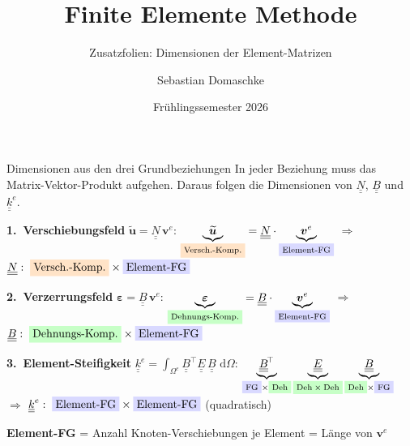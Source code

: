 \documentclass[aspectratio=169,professionalfonts]{beamer}
\title[FEM Zusatz]{Finite Elemente Methode}
\subtitle{Zusatzfolien: Dimensionen der Element-Matrizen}
\author[ZHAW]{Sebastian Domaschke}
\institute[ZHAW]{Zürcher Hochschule für Angewandte Wissenschaften (ZHAW)}
\date{Frühlingssemester 2026}
\newcommand{\hlg}[1]{\text{\colorbox{green!22}{\ensuremath{#1}}}}
\newcommand{\hlb}[1]{\text{\colorbox{blue!15}{\ensuremath{#1}}}}
\newcommand{\hlo}[1]{\text{\colorbox{orange!22}{\ensuremath{#1}}}}
\newcommand{\dd}{\,\mathrm{d}}
\newcommand{\mat}[1]{\underline{\underline{#1}}}
\newcommand{\Nmat}{\mat{N}}
\newcommand{\Bmat}{\mat{B}}
\newcommand{\Emat}{\mat{E}}
\newcommand{\ke}{\mat{k}^{e}}
\begin{document}
\begin{frame}
  \titlepage
\end{frame}

\begin{frame}{Dimensionen aus den drei Grundbeziehungen}
  \footnotesize
  In jeder Beziehung muss das Matrix-Vektor-Produkt aufgehen.
  Daraus folgen die Dimensionen von $\Nmat$, $\Bmat$ und $\ke$.

  \vspace{0.3em}
  \begin{tcolorbox}[colback=blue!6, colframe=blue!70!black, boxrule=0.8pt,
      left=6pt, right=6pt, top=2pt, bottom=2pt]
    \textbf{1.\ Verschiebungsfeld} $\widetilde{\bm{u}} = \Nmat\,\bm{v}^e$:
    \;\;
    $\underbrace{\widetilde{\bm{u}}}_{\hlo{\text{Versch.-Komp.}}}
      = \Nmat \cdot \underbrace{\bm{v}^e}_{\hlb{\text{Element-FG}}}$
    \;\;$\Longrightarrow$\;\;
    $\Nmat:\;\hlo{\text{Versch.-Komp.}} \times \hlb{\text{Element-FG}}$
  \end{tcolorbox}

  \begin{tcolorbox}[colback=green!6, colframe=green!55!black, boxrule=0.8pt,
      left=6pt, right=6pt, top=2pt, bottom=2pt]
    \textbf{2.\ Verzerrungsfeld} $\bm{\varepsilon} = \Bmat\,\bm{v}^e$:
    \;\;
    $\underbrace{\bm{\varepsilon}}_{\hlg{\text{Dehnungs-Komp.}}}
      = \Bmat \cdot \underbrace{\bm{v}^e}_{\hlb{\text{Element-FG}}}$
    \;\;$\Longrightarrow$\;\;
    $\Bmat:\;\hlg{\text{Dehnungs-Komp.}} \times \hlb{\text{Element-FG}}$
  \end{tcolorbox}

  \begin{tcolorbox}[colback=orange!6, colframe=orange!80!black, boxrule=0.8pt,
      left=6pt, right=6pt, top=2pt, bottom=2pt]
    \textbf{3.\ Element-Steifigkeit} $\ke = \int_{\Omega^e}\Bmat^{\!\top}\Emat\,\Bmat\,\dd\Omega$:
    \;\;
    $\underbrace{\Bmat^{\!\top}}_{\hlb{\text{FG}}\times\hlg{\text{Deh}}}
      \underbrace{\Emat}_{\hlg{\text{Deh}\times\text{Deh}}}
      \underbrace{\Bmat}_{\hlg{\text{Deh}}\times\hlb{\text{FG}}}$
    \;\;$\Longrightarrow$\;\;
    $\ke:\;\hlb{\text{Element-FG}}\times\hlb{\text{Element-FG}}$
    (quadratisch)
  \end{tcolorbox}

  \vspace{0.2em}
  \centering
  \scriptsize
  \textbf{Element-FG} = Anzahl Knoten-Verschiebungen je Element = Länge von $\bm{v}^e$
\end{frame}
\end{document}
